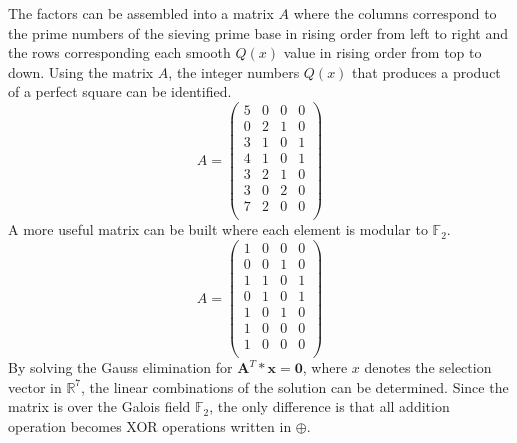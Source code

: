 \documentclass[11pt,a4paper]{article}
\begin{document}
The factors can be assembled into a matrix $A$ where the columns correspond to the prime numbers of the sieving prime base in rising order from left to right and the rows corresponding each smooth $Q(x)$ value in rising order from top to down. Using the matrix $A$, the integer numbers $Q(x)$ that produces a product of a perfect square can be identified.
\[
A = \left(
\begin{array}{*{4}{c}}
5 & 0 & 0 & 0 \\
0 & 2 & 1 & 0 \\
3 & 1 & 0 & 1 \\
4 & 1 & 0 & 1 \\
3 & 2 & 1 & 0 \\
3 & 0 & 2 & 0 \\
7 & 2 & 0 & 0 \\
\end{array}
\right)
\]
A more useful matrix can be built where each element is modular to $\mathbb{F}_2$.
\[
A = \left(
\begin{array}{*{4}{c}}
1 & 0 & 0 & 0 \\
0 & 0 & 1 & 0 \\
1 & 1 & 0 & 1 \\
0 & 1 & 0 & 1 \\
1 & 0 & 1 & 0 \\
1 & 0 & 0 & 0 \\
1 & 0 & 0 & 0 \\
\end{array}
\right)
\]
By solving the Gauss elimination for $\mathbf{A}^T*\mathbf{x} = \mathbf{0}$, where $x$ denotes the selection vector in $\mathbb{R}^7$, the linear combinations of the solution can be determined. Since the matrix is over the Galois field $\mathbb{F}_2$, the only difference is that all addition operation becomes XOR operations written in $\oplus$. 
\end{document}
